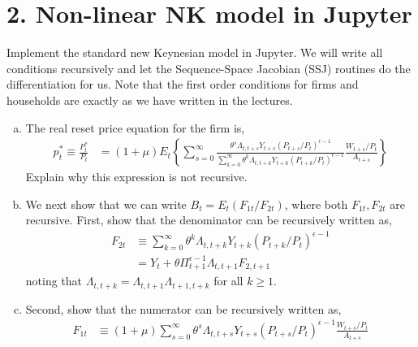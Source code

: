 \documentclass{article}
\newcommand{\1}{\mathbf{1}}
\begin{document}
\section*{2. Non-linear NK model in Jupyter}
Implement the standard new Keynesian model in Jupyter. We will write all conditions recursively and let the Sequence-Space Jacobian (SSJ) routines do the differentiation for us. Note that the first order conditions for firms and households are exactly as we have written in the lectures.
\begin{enumerate}[(a)]
	\item The real reset price equation for the firm is,
	\begin{align*}
		p_t^*\equiv\frac{P_t^*}{P_{t}} &=  (1+\mu)E_t\left\{\sum_{s=0}^{\infty}\frac{\theta^s\Lambda_{t,t+s}Y_{t+s}(P_{t+s}/P_t)^{\epsilon-1}}{\sum_{k=0}^{\infty}\theta^k\Lambda_{t,t+k}Y_{t+k}(P_{t+k}/P_t)^{\epsilon-1}}\frac{W_{t+s}/P_{t}}{A_{t+s}}\right\}
	\end{align*}
	Explain why this expression is not recursive.
	\item We next show that we can write $B_t=E_t(F_{1t}/F_{2t})$, where both $F_{1t},F_{2t}$ are recursive. First, show that the denominator can be recursively written as,
	\begin{align*}
		F_{2t}&\equiv \sum_{k=0}^{\infty}\theta^k\Lambda_{t,t+k}Y_{t+k}(P_{t+k}/P_t)^{\epsilon-1} \\
		&=Y_t+\theta\Pi_{t+1}^{\epsilon-1}\Lambda_{t,t+1}F_{2,t+1}
	\end{align*}
	noting that $\Lambda_{t,t+k}=\Lambda_{t,t+1}\Lambda_{t+1,t+k}$ for all $k\ge 1$.
	\item Second, show that the numerator can be recursively written as,
	\begin{align*}
		F_{1t}&\equiv (1+\mu)\sum_{s=0}^{\infty}\theta^s\Lambda_{t,t+s}Y_{t+s}(P_{t+s}/P_t)^{\epsilon-1}\frac{W_{t+s}/P_{t}}{A_{t+s}}  \\

\end{align*}
\end{enumerate}
\end{document}
